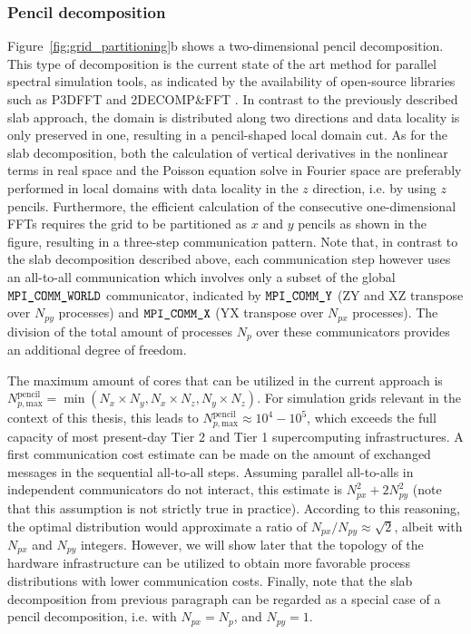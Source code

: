 \subsubsection{Pencil decomposition} 
Figure~\ref{fig:grid_partitioning}b shows a two-dimensional pencil decomposition. This type of decomposition is the current state of the art method for parallel spectral simulation tools, as indicated by the availability of open-source libraries such as P3DFFT \citep{pekurovsky2012p3dfft} and 2DECOMP\&FFT \citep{li20102decomp}. In contrast to the previously described slab approach, the domain is distributed along two directions and data locality is only preserved in one, resulting in a pencil-shaped local domain cut. As for the slab decomposition, both the calculation of vertical derivatives in the nonlinear terms in real space and the Poisson equation solve in Fourier space are preferably performed in local domains with data locality in the $z$ direction, i.e. by using $z$ pencils. Furthermore, the efficient calculation of the consecutive one-dimensional FFTs requires the grid to be partitioned as $x$ and $y$ pencils as shown in the figure, resulting in a three-step communication pattern. Note that, in contrast to the slab decomposition described above, each communication step however uses an all-to-all communication which involves only a subset of the global $\verb|MPI_COMM_WORLD|$ communicator, indicated by $\verb|MPI_COMM_Y|$ (ZY and XZ transpose over $N_{py}$ processes) and $\verb|MPI_COMM_X|$ (YX transpose over $N_{px}$ processes). The division of the total amount of processes $N_p$ over these communicators provides an additional degree of freedom. 

The maximum amount of cores that can be utilized in the current approach is $N_{p,\text{max}}^{\text{pencil}} = \min(N_x \times N_y, N_x \times N_z, N_y \times N_z)$. For simulation grids relevant in the context of this thesis, this leads to $N_{p,\text{max}}^{\text{pencil}} \approx 10^4 - 10^5$, which exceeds the full capacity of most present-day Tier 2 and Tier 1 supercomputing infrastructures. A first communication cost estimate can be made on the amount of exchanged messages in the sequential all-to-all steps. Assuming parallel all-to-alls in independent communicators do not interact, this estimate is $N_{px}^2 + 2N_{py}^2$ (note that this assumption is not strictly true in practice). According to this reasoning, the optimal distribution would approximate a ratio of $N_{px}/N_{py} \approx \sqrt{2}$, albeit with $N_{px}$ and $N_{py}$ integers. However, we will show later that the topology of the hardware infrastructure can be utilized to obtain more favorable process distributions with lower communication costs. Finally, note that the slab decomposition from previous paragraph can be regarded as a special case of a pencil decomposition, i.e. with $N_{px} = N_p$, and $N_{py} = 1$. 

